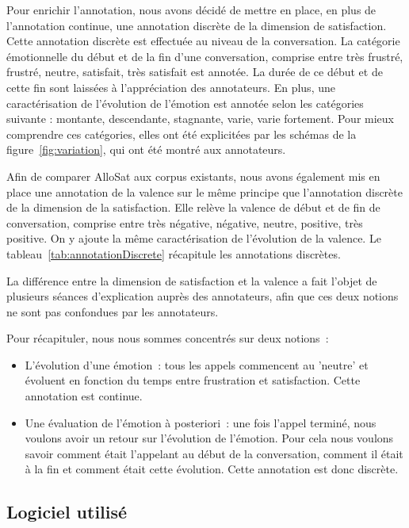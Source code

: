 Pour enrichir l'annotation, nous avons décidé de mettre en place, en plus de l'annotation continue, une annotation discrète de la dimension de satisfaction. Cette annotation discrète est effectuée au niveau de la conversation. La catégorie émotionnelle du début et de la fin d'une conversation, comprise entre très frustré, frustré, neutre, satisfait, très satisfait est annotée. La durée de ce début et de cette fin sont laissées à l'appréciation des annotateurs. En plus, une caractérisation de l'évolution de l'émotion est annotée selon les catégories suivante : montante, descendante, stagnante, varie, varie fortement. Pour mieux comprendre ces catégories, elles ont été explicitées par les schémas de la figure~\ref{fig:variation}, qui ont été montré aux annotateurs.



Afin de comparer AlloSat aux corpus existants, nous avons également mis en place une annotation de la valence sur le même principe que l'annotation discrète de la dimension de la satisfaction. Elle relève la valence de début et de fin de conversation, comprise entre très négative, négative, neutre, positive, très positive. On y ajoute la même caractérisation de l'évolution de la valence. Le tableau~\ref{tab:annotationDiscrete} récapitule les annotations discrètes.



La différence entre la dimension de satisfaction et la valence a fait l'objet de plusieurs séances d'explication auprès des annotateurs, afin que ces deux notions ne sont pas confondues par les annotateurs.

Pour récapituler, nous nous sommes concentrés sur deux notions :
\begin{itemize}
  \item L'évolution d'une émotion : tous les appels commencent au 'neutre' et évoluent en fonction du temps entre frustration et satisfaction. Cette annotation est continue.
  \item Une évaluation de l'émotion à posteriori : une fois l'appel terminé, nous voulons avoir un retour sur l'évolution de l'émotion. Pour cela nous voulons savoir comment était l'appelant au début de la conversation, comment il était à la fin et comment était cette évolution. Cette annotation est donc discrète.
\end{itemize}

\subsection{Logiciel utilisé}

